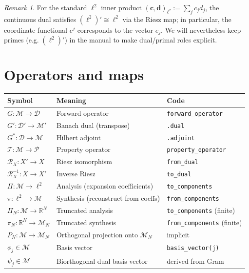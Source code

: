 \documentclass[11pt,twoside,openright]{book}
\theoremstyle{plain}
\theoremstyle{definition}
\theoremstyle{remark}
\newtheorem*{remark}{Remark}
\newcommand{\modelspace}{\mathcal{M}}
\newcommand{\dataspace}{\mathcal{D}}
\begin{document}
\begin{remark}
For the standard $\ell^2$ inner product $(\mathbf{c},\mathbf{d})_{\ell^2} := \sum_j c_j d_j$, the continuous dual satisfies $(\ell^2)' \cong \ell^2$ via the Riesz map; in particular, the coordinate functional $e^j$ corresponds to the vector $e_j$. We will nevertheless keep primes (e.g. $(\ell^2)'$) in the manual to make dual/primal roles explicit.
\end{remark}

\section*{Operators and maps}

\begin{longtable}{lll}
\toprule
Symbol & Meaning & Code \\
\midrule
$G : \modelspace \to \dataspace$ & Forward operator & \texttt{forward\_operator} \\
$G' : \dataspace' \to \modelspace'$ & Banach dual (transpose) & \texttt{.dual} \\
$G^* : \dataspace \to \modelspace$ & Hilbert adjoint & \texttt{.adjoint} \\
$\mathcal{T} : \modelspace \to \mathcal{P}$ & Property operator & \texttt{property\_operator} \\
$\mathcal{R}_X : X' \to X$ & Riesz isomorphism & \texttt{from\_dual} \\
$\mathcal{R}_X^{-1} : X \to X'$ & Inverse Riesz & \texttt{to\_dual} \\
$\Pi : \modelspace \to \ell^2$ & Analysis (expansion coefficients) & \texttt{to\_components} \\
$\pi : \ell^2 \to \modelspace$ & Synthesis (reconstruct from coeffs) & \texttt{from\_components} \\
$\Pi_N : \modelspace \to \mathbb{R}^N$ & Truncated analysis & \texttt{to\_components} (finite) \\
$\pi_N : \mathbb{R}^N \to \modelspace_N$ & Truncated synthesis & \texttt{from\_components} (finite) \\
$P_N : \modelspace \to \modelspace_N$ & Orthogonal projection onto $\modelspace_N$ & implicit \\
$\phi_j \in \modelspace$ & Basis vector & \texttt{basis\_vector(j)} \\
$\psi_j \in \modelspace$ & Biorthogonal dual basis vector & derived from Gram \\
\bottomrule
\end{longtable}
\end{document}
